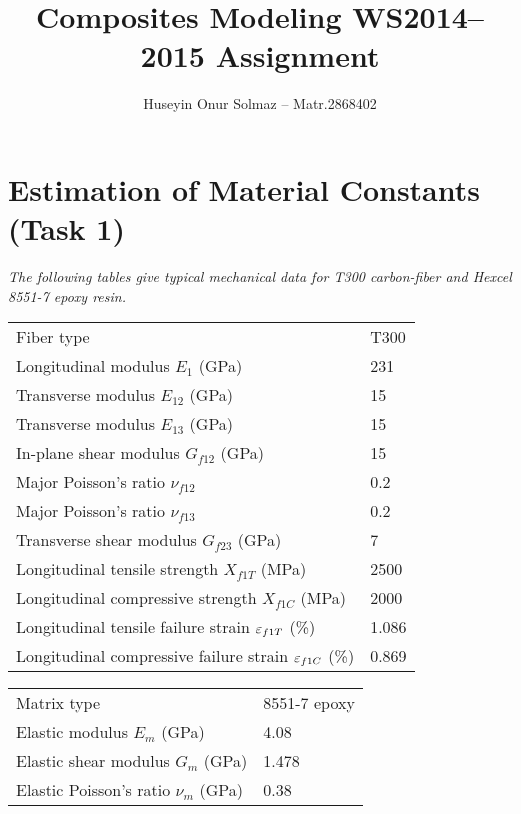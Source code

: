 \documentclass[a4paper,twosided,12pt,DIV12]{scrartcl}
\title{Composites Modeling WS2014--2015 Assignment}
\author{Huseyin Onur Solmaz -- Matr.2868402}
\date{}
\newcommand{\veps}{\vareps}
\begin{document}
\maketitle
\tableofcontents

\section{Estimation of Material Constants (Task 1)}

\textit{The following tables give typical mechanical data for T300 carbon-fiber and
Hexcel 8551-7 epoxy resin.}

\begin{table}[H]
  \centering
  \begin{minipage}{0.45\textwidth}
    \footnotesize
  \begin{tabular}{p{}p{}}
    \toprule
    Fiber type & T300\\
    Longitudinal modulus $E_{1}$ (GPa) & 231\\
    Transverse modulus $E_{12}$ (GPa) & 15\\
    Transverse modulus $E_{13}$ (GPa) & 15\\
    In-plane shear modulus $G_{f12}$ (GPa) & 15\\
    Major Poisson's ratio $\nu_{f12}$ & 0.2\\
    Major Poisson's ratio $\nu_{f13}$ & 0.2\\
    Transverse shear modulus $G_{f23}$ (GPa) & 7\\
    Longitudinal tensile strength $X_{f1T}$ (MPa) & 2500\\
    Longitudinal compressive strength $X_{f1C}$ (MPa) & 2000\\
    Longitudinal tensile failure strain $\veps_{f1T}$ (\%) & 1.086\\
    Longitudinal compressive failure strain $\veps_{f1C}$ (\%) & 0.869\\
    \bottomrule
  \end{tabular}
  \end{minipage}
  \begin{minipage}{0.45\textwidth}
    \footnotesize
  \begin{tabular}{p{}p{}}
    \toprule
    Matrix type & 8551-7 epoxy\\
    Elastic modulus $E_{m}$ (GPa) & 4.08\\
    Elastic shear modulus $G_{m}$ (GPa) & 1.478\\
    Elastic Poisson's ratio $\nu_{m}$ (GPa) & 0.38\\

\end{tabular}
\end{minipage}
\end{table}
\end{document}
